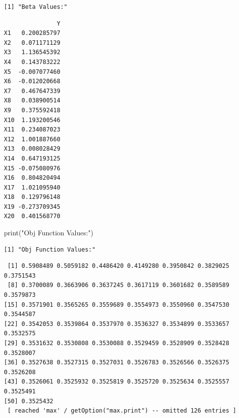 \documentclass[
  letterpaper,
  DIV=11,
  numbers=noendperiod]{scrartcl}
\newenvironment{Shaded}{\begin{snugshade}}{\end{snugshade}}
\newcommand{\FunctionTok}[1]{\textcolor[rgb]{0.28,0.35,0.67}{#1}}
\newcommand{\NormalTok}[1]{\textcolor[rgb]{0.00,0.23,0.31}{#1}}
\newcommand{\SpecialCharTok}[1]{\textcolor[rgb]{0.37,0.37,0.37}{#1}}
\newcommand{\StringTok}[1]{\textcolor[rgb]{0.13,0.47,0.30}{#1}}
\begin{document}
\begin{verbatim}
[1] "Beta Values:"
\end{verbatim}

\begin{Shaded}
\end{Shaded}

\begin{verbatim}
               Y
X1   0.200285797
X2   0.071171129
X3   1.136545392
X4   0.143783222
X5  -0.007077460
X6  -0.012020668
X7   0.467647339
X8   0.038900514
X9   0.375592418
X10  1.193200546
X11  0.234087023
X12  1.001887660
X13  0.008028429
X14  0.647193125
X15 -0.075080976
X16  0.804820494
X17  1.021095940
X18  0.129796148
X19 -0.273709345
X20  0.401568770
\end{verbatim}

\begin{Shaded}
\begin{Highlighting}[]
\FunctionTok{print}\NormalTok{(}\StringTok{"Obj Function Values:"}\NormalTok{)}
\end{Highlighting}
\end{Shaded}

\begin{verbatim}
[1] "Obj Function Values:"
\end{verbatim}

\begin{Shaded}
\end{Shaded}

\begin{verbatim}
 [1] 0.5908489 0.5059182 0.4486420 0.4149280 0.3950842 0.3829025 0.3751543
 [8] 0.3700089 0.3663906 0.3637245 0.3617119 0.3601682 0.3589589 0.3579873
[15] 0.3571901 0.3565265 0.3559689 0.3554973 0.3550960 0.3547530 0.3544587
[22] 0.3542053 0.3539864 0.3537970 0.3536327 0.3534899 0.3533657 0.3532575
[29] 0.3531632 0.3530808 0.3530088 0.3529459 0.3528909 0.3528428 0.3528007
[36] 0.3527638 0.3527315 0.3527031 0.3526783 0.3526566 0.3526375 0.3526208
[43] 0.3526061 0.3525932 0.3525819 0.3525720 0.3525634 0.3525557 0.3525491
[50] 0.3525432
 [ reached 'max' / getOption("max.print") -- omitted 126 entries ]
\end{verbatim}
\end{document}
